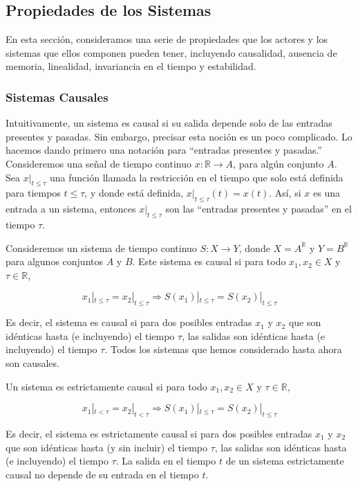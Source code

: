 \documentclass[12pt,a4paper]{article}
\begin{document}
\subsection{Propiedades de los Sistemas}

En esta sección, consideramos una serie de propiedades que los actores y los sistemas que ellos componen pueden tener, incluyendo causalidad, ausencia de memoria, linealidad, invariancia en el tiempo y estabilidad.

\subsubsection{Sistemas Causales}

Intuitivamente, un sistema es causal si su salida depende solo de las entradas presentes y pasadas. Sin embargo, precisar esta noción es un poco complicado. Lo hacemos dando primero una notación para “entradas presentes y pasadas.” Consideremos una señal de tiempo continuo $x : \mathbb{R}\rightarrow A$, para algún conjunto $A$.
Sea $x|_{t\leq\tau}$ una función llamada la restricción en el tiempo que solo está definida para tiempos $t \leq \tau$, y donde está definida, $x|_{t\leq\tau}(t) = x(t)$. Así, si $x$ es una entrada a un sistema, entonces $x|_{t\leq\tau}$ son las “entradas presentes y pasadas” en el tiempo $\tau$.

Consideremos un sistema de tiempo continuo $S : X \rightarrow Y$, donde $X = A^{\mathbb{R}}$ y $Y = B^{\mathbb{R}}$ para algunos conjuntos $A$ y $B$. Este sistema es causal si para todo $x_1, x_2 \in X$ y $\tau \in \mathbb{R}$,

\[
x_1|_{t\leq\tau} = x_2|_{t\leq\tau} \Rightarrow S(x_1)|_{t\leq\tau} = S(x_2)|_{t\leq\tau}
\]

Es decir, el sistema es causal si para dos posibles entradas $x_1$ y $x_2$ que son idénticas hasta (e incluyendo) el tiempo $\tau$, las salidas son idénticas hasta (e incluyendo) el tiempo $\tau$. Todos los sistemas que hemos considerado hasta ahora son causales.

Un sistema es estrictamente causal si para todo $x_1, x_2 \in X$ y $\tau \in \mathbb{R}$,

\[
x_1|_{t<\tau} = x_2|_{t<\tau} \Rightarrow S(x_1)|_{t\leq\tau} = S(x_2)|_{t\leq\tau}
\]

Es decir, el sistema es estrictamente causal si para dos posibles entradas $x_1$ y $x_2$ que son idénticas hasta (y sin incluir) el tiempo $\tau$, las salidas son idénticas hasta (e incluyendo) el tiempo $\tau$.
La salida en el tiempo $t$ de un sistema estrictamente causal no depende de su entrada en el tiempo $t$.
\end{document}
